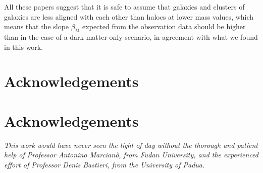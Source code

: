 \documentclass[a4paper,11pt]{article}
\begin{document}
All these papers suggest that it is safe to assume that galaxies and clusters of galaxies are less aligned with each other than haloes at lower mass values, which means that the slope $\beta_{\mathrm{M}}$ expected from the observation data should be higher than in the case of a dark matter-only scenario, in agreement with what we found in this work.


\section*{Acknowledgements}







\section*{Acknowledgements}

\emph{This work would have never seen the light of day without the thorough and patient help of Professor Antonino Marcianò, from Fudan University, and the experienced effort of Professor Denis Bastieri, from the University of Padua.} 
\end{document}
